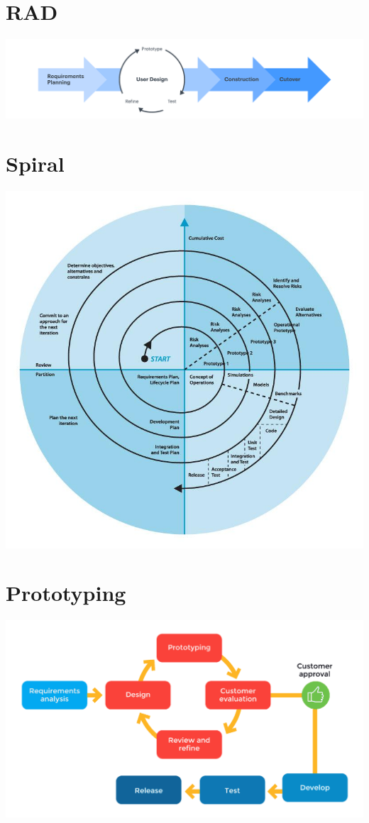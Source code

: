 \documentclass{article}[18pt]
\begin{document}
\section{RAD}
\begin{center}
	\includegraphics[scale=0.7]{RAD}
\end{center}
\section{Spiral}

\begin{center}
	\includegraphics[scale=0.7]{Spiral}
\end{center}
\section{Prototyping}
\begin{center}
	\includegraphics[scale=0.7]{Prototyping}
\end{center}
\end{document}
